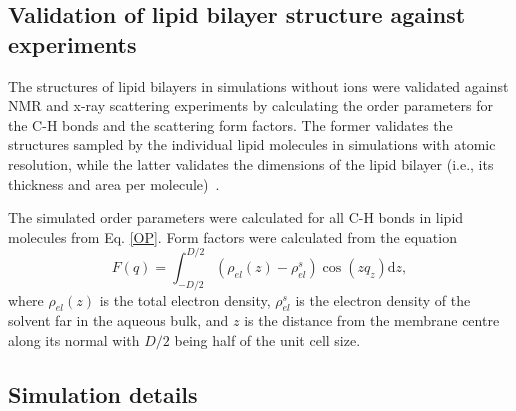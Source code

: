 \documentclass[aip,jcp,twocolumn]{revtex4}
\begin{document}
\subsection{Validation of lipid bilayer structure against experiments}

The structures of lipid bilayers in simulations without ions were validated against NMR and 
\mbox{x-ray} scattering experiments by calculating the order parameters
for the C-H bonds and the scattering form factors. The former validates the structures sampled by the individual
lipid molecules in simulations with atomic resolution, while the latter
validates the dimensions of the lipid bilayer (i.e., its thickness and area per
molecule)~\cite{ollila16}.

The simulated order parameters were calculated for all C-H bonds
in lipid molecules from Eq. \ref{OP}. Form factors were calculated 
from the equation
\begin{equation}
  F(q) = \int _{-D/2} ^{D/2} \left ( \rho_{el}(z) - \rho_{el}^s \right ) \cos (zq_z) \mathrm{d}z,
\end{equation}
where $\rho_{el} (z)$ is the total electron density,
$\rho_{el}^s$ is the electron density of the solvent far in the aqueous bulk,
and $z$ is the distance from the membrane centre along its normal 
with $D/2$ being half of the unit cell size. 




\subsection{Simulation details}
\end{document}
